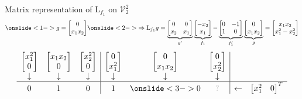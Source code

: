 \documentclass[10pt,T]{beamer}
\newcommand{\transparent}[1]{\textcolor{lightgray}{#1}}
\begin{document}
\begin{frame}[b]{Matrix representation of L$_{f_1}$ on $\mathcal{V}_2^2$}
\begin{equation*}
  \onslide<1->{g=\begin{bmatrix}0\\x_1x_2\end{bmatrix}}
  \onslide<2->{\Rightarrow\text{L}_{f_1}g=\underbrace{\begin{bmatrix}0&0\\x_2&x_1\end{bmatrix}}_{g'}\underbrace{\begin{bmatrix}-x_2\\x_1\end{bmatrix}}_{f_1}
    -\underbrace{\begin{bmatrix}0&-1\\1&0\end{bmatrix}}_{f_1'}\underbrace{\begin{bmatrix}0\\x_1x_2\end{bmatrix}}_{g}=\begin{bmatrix}x_1x_2\\x_1^2-x_2^2\end{bmatrix}}
\end{equation*}
\begin{equation*}
  \begin{array}{ccc|ccc|cc}
    \begin{bmatrix}x_1^2\\0\end{bmatrix}&\begin{bmatrix}x_1x_2\\0\end{bmatrix}&\begin{bmatrix}x_2^2\\0\end{bmatrix}&\begin{bmatrix}0\\x_1^2\end{bmatrix}&\begin{bmatrix}0\\x_1x_2\end{bmatrix}&\begin{bmatrix}0\\x_2^2\end{bmatrix}&&\\
    \downarrow&\downarrow&\downarrow&\downarrow&\downarrow&\downarrow&&\\\hline
    0&1&0&1&\onslide<3->{0}&\transparent{?}&\leftarrow&\begin{bmatrix}x_1^2&0\end{bmatrix}^T\\

\end{array}
\end{equation*}
\end{frame}
\end{document}
